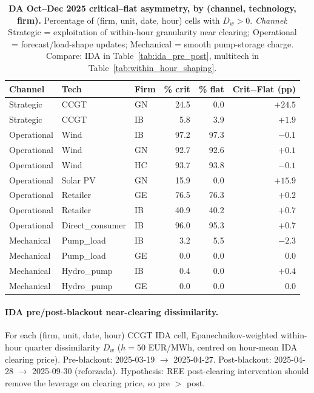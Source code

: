\documentclass[11pt,a4paper]{article}
\begin{document}
\begin{table}[H]
\centering\footnotesize
\caption{\textbf{DA Oct--Dec 2025 critical--flat asymmetry, by (channel, technology, firm).} Percentage of (firm, unit, date, hour) cells with $D_w > 0$. \emph{Channel}: Strategic = exploitation of within-hour granularity near clearing; Operational = forecast/load-shape updates; Mechanical = smooth pump-storage charge. Compare: IDA in Table~\ref{tab:ida_pre_post}, multitech in Table~\ref{tab:within_hour_shaping}.}
\label{tab:prov:operational_strategic_asym}
\setlength{\tabcolsep}{6pt}
\begin{tabular}{l l l r r r}
\toprule
Channel & Tech & Firm & \% crit & \% flat & Crit$-$Flat (pp) \\
\midrule
Strategic       & CCGT      & GN & 24.5 &  0.0 & $+24.5$ \\
Strategic       & CCGT      & IB &  5.8 &  3.9 & $+1.9$ \\
\addlinespace
Operational     & Wind      & IB & 97.2 & 97.3 & $-0.1$ \\
Operational     & Wind      & GN & 92.7 & 92.6 & $+0.1$ \\
Operational     & Wind      & HC & 93.7 & 93.8 & $-0.1$ \\
Operational     & Solar PV  & GN & 15.9 &  0.0 & $+15.9$ \\
Operational     & Retailer  & GE & 76.5 & 76.3 & $+0.2$ \\
Operational     & Retailer  & IB & 40.9 & 40.2 & $+0.7$ \\
Operational     & Direct\_consumer & IB & 96.0 & 95.3 & $+0.7$ \\
\addlinespace
Mechanical      & Pump\_load   & IB &  3.2 &  5.5 & $-2.3$ \\
Mechanical      & Pump\_load   & GE &  0.0 &  0.0 & $0.0$ \\
Mechanical      & Hydro\_pump  & IB &  0.4 &  0.0 & $+0.4$ \\
Mechanical      & Hydro\_pump  & GE &  0.0 &  0.0 & $0.0$ \\
\bottomrule
\end{tabular}
\end{table}

\paragraph{IDA pre/post-blackout near-clearing dissimilarity.}\label{sec:prov:ida_pre_post}
For each (firm, unit, date, hour) CCGT IDA cell, Epanechnikov-weighted within-hour quarter dissimilarity $D_w$ ($h = 50$ EUR/MWh, centred on hour-mean IDA clearing price). Pre-blackout: 2025-03-19 $\to$ 2025-04-27. Post-blackout: 2025-04-28 $\to$ 2025-09-30 (reforzada). Hypothesis: REE post-clearing intervention should remove the leverage on clearing price, so pre $>$ post.
\end{document}
